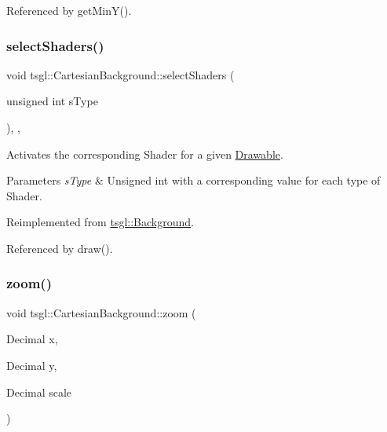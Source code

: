 Referenced by get\+Min\+Y().

\mbox{\label{classtsgl_1_1_cartesian_background_a3d898bf3fe826c563e74c72e93cd3c74}} 
\subsubsection{\texorpdfstring{select\+Shaders()}{selectShaders()}}
{\footnotesize\ttfamily void tsgl\+::\+Cartesian\+Background\+::select\+Shaders (\begin{DoxyParamCaption}\item[{unsigned int}]{s\+Type }\end{DoxyParamCaption})\hspace{0.3cm}{\ttfamily [override]}, {\ttfamily [protected]}, {\ttfamily [virtual]}}



Activates the corresponding Shader for a given \hyperlink{classtsgl_1_1_drawable}{Drawable}. 


\begin{DoxyParams}{Parameters}
{\em s\+Type} & Unsigned int with a corresponding value for each type of Shader. \\
\hline
\end{DoxyParams}


Reimplemented from \hyperlink{classtsgl_1_1_background_a5207bcb45daafed4d6a739a8a0a0829e}{tsgl\+::\+Background}.



Referenced by draw().

\mbox{\label{classtsgl_1_1_cartesian_background_afd50b54bbeeace2a72e39363f76a460f}} 
\subsubsection{\texorpdfstring{zoom()}{zoom()}\hspace{0.1cm}{\footnotesize\ttfamily [1/2]}}
{\footnotesize\ttfamily void tsgl\+::\+Cartesian\+Background\+::zoom (\begin{DoxyParamCaption}\item[{Decimal}]{x,  }\item[{Decimal}]{y,  }\item[{Decimal}]{scale }\end{DoxyParamCaption})}



